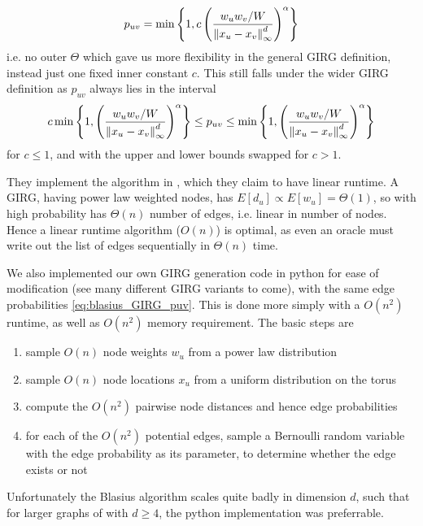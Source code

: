 \begin{equation}
    p_{uv} = \min \left \{ 
        1,
        c \left (
            \frac{w_u w_v / W}{\left\lVert x_u - x_v\right\rVert_\infty^d}
        \right )^\alpha    
    \right \}
    \label{eq:blasius_GIRG_puv}
\end{equation}
i.e. no outer $\Theta$ which gave us more flexibility in the general GIRG definition, instead just one fixed inner constant $c$. 
This still falls under the wider GIRG definition 
as $p_{uv}$ always lies in the interval 
\begin{equation}
    c \min \left \{ 
        1,
        \left (
            \frac{w_u w_v / W}{\left\lVert x_u - x_v\right\rVert_\infty^d}
        \right )^\alpha    
    \right \} \leq p_{uv} \leq \min \left \{ 
        1,
        \left (
            \frac{w_u w_v / W}{\left\lVert x_u - x_v\right\rVert_\infty^d}
        \right )^\alpha    
    \right \}
\end{equation}
for $c \leq 1$, and with the upper and lower bounds swapped for $c > 1$.


They implement the algorithm in \cite{bringmann2019geometric}, which they claim to have linear runtime.
A GIRG, having power law weighted nodes, has $E[d_u] \propto E[w_u] = \Theta(1)$, so with high probability has $\Theta(n)$ number of edges, i.e. linear in number of nodes.
Hence a linear runtime algorithm ($O(n)$) is optimal, as even an oracle must write out the list of edges sequentially in $\Theta(n)$ time.

We also implemented our own GIRG generation code in python for ease of modification (see many different GIRG variants to come), with the same edge probabilities \cref{eq:blasius_GIRG_puv}. This is done more simply with a $O(n^2)$ runtime, as well as $O(n^2)$ memory requirement. The basic steps are 
\begin{enumerate}
    \item sample $O(n)$ node weights $w_u$ from a power law distribution
    \item sample $O(n)$ node locations $x_u$ from a uniform distribution on the torus
    \item compute the $O(n^2)$ pairwise node distances and hence edge probabilities
    \item for each of the $O(n^2)$ potential edges, sample a Bernoulli random variable with the edge probability as its parameter, to determine whether the edge exists or not
\end{enumerate}
Unfortunately the Blasius algorithm scales quite badly in dimension $d$, such that for larger graphs of with $d \geq 4$, the python implementation was preferrable.




